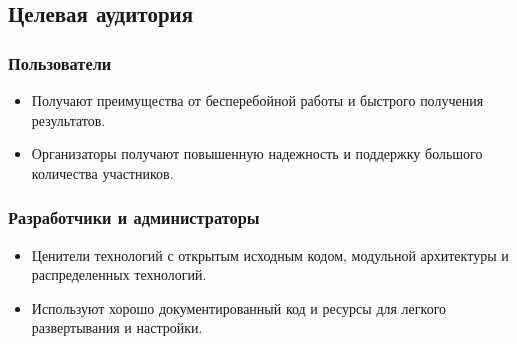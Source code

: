 \subsection{Целевая аудитория}
\subsubsection*{Пользователи}
\begin{itemize}
    \itemsep 0em 
    \item Получают преимущества от бесперебойной работы и быстрого получения результатов.
    \item Организаторы получают повышенную надежность и поддержку большого количества участников.
\end{itemize}

\subsubsection*{Разработчики и администраторы}
\begin{itemize}
    \itemsep 0em 
    \item Ценители технологий с открытым исходным кодом, модульной архитектуры и распределенных технологий.
    \item Используют хорошо документированный код и ресурсы для легкого развертывания и настройки.
\end{itemize}